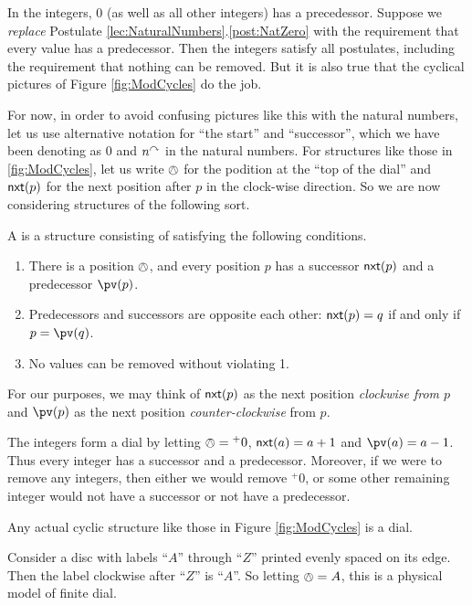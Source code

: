 In the integers, $0$ (as well as all other integers) has a precedessor. Suppose we \emph{replace} Postulate \ref{lec:NaturalNumbers}.\ref{post:NatZero} with the requirement that every value has a predecessor. 
Then the integers satisfy all postulates, including the requirement that nothing can be removed.
But it is also true that the cyclical pictures of Figure \ref{fig:ModCycles} do the job. 

For now, in order to avoid confusing pictures like this with the natural numbers, let us use alternative notation for ``the start'' and ``successor'', which we have been denoting as $0$ and $n^\curvearrowright$ in the natural numbers.
For structures like those in \ref{fig:ModCycles}, let us write $\owedge$ for the podition at the ``top of the dial'' and ${\mathord{\textsf{nxt}}}(p)$ for the next position after $p$ in the clock-wise direction.
So we are now considering structures of the following sort.

\begin{defn}
	A  is a structure consisting of  satisfying the following conditions.
\begin{enumerate}
	\item There is a position $\owedge$, and every position $p$ has a successor ${\mathord{\textsf{nxt}}}(p)$ and a predecessor $\pv(p)$.
	\item Predecessors and successors are opposite each other: ${\mathord{\textsf{nxt}}}(p) = q$ if and only if $p = \pv(q)$.
	\item No values can be removed without violating 1.
\end{enumerate}

For our purposes, we may think of ${\mathord{\textsf{nxt}}}(p)$ as the next position \emph{clockwise from $p$} and $\pv(p)$ as the next position \emph{counter-clockwise} from $p$. 
\end{defn}

\begin{example}
The integers form a dial by letting $\owedge={}^+0$, ${\mathord{\textsf{nxt}}}(a)=a+1$ and $\pv(a)=a-1$. Thus
every integer has a successor and a predecessor. Moreover, if we were to remove any integers, then either we would remove ${}^+0$, or some other remaining integer would not have a successor or not have a predecessor.

Any actual cyclic structure like those in Figure \ref{fig:ModCycles} is a dial.

Consider a disc with labels ``$A$'' through ``$Z$'' printed evenly spaced on its edge. Then the label clockwise after ``$Z$'' is ``$A$''. So letting $\owedge = A$, this is a physical model of finite dial.
\end{example}  

